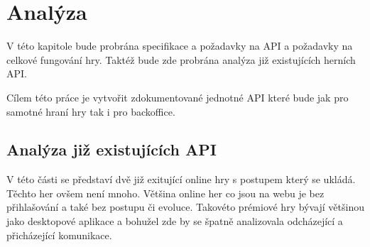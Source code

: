\chapter{Analýza}
V této kapitole bude probrána specifikace a požadavky na API a požadavky na celkové fungování hry.
Taktéž bude zde probrána analýza již existujících herních API.

Cílem této práce je vytvořit zdokumentované jednotné API které bude jak pro samotné hraní hry tak i pro backoffice.
\section{Analýza již existujících API}
V této části se představí dvě již exitující online hry s postupem který se ukládá. Těchto her ovšem není mnoho. Většina online her co jsou na webu je bez přihlašování a také bez postupu či evoluce. Takovéto prémiové hry bývají většinou jako desktopové aplikace a bohužel zde by se špatně analizovala odcházející a přicházející komunikace.